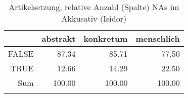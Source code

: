 \begin{table}[ht]
\centering
\begin{tabular}{rrrr}
  \lsptoprule
 & abstrakt & konkretum & menschlich \\ 
  \midrule
FALSE & 87.34 & 85.71 & 77.50 \\ 
  TRUE & 12.66 & 14.29 & 22.50 \\ 
  Sum & 100.00 & 100.00 & 100.00 \\ 
   \lspbottomrule
\end{tabular}
\caption{Artikelsetzung, relative Anzahl (Spalte) NAs im Akkusativ (Isidor)} 
\end{table}
